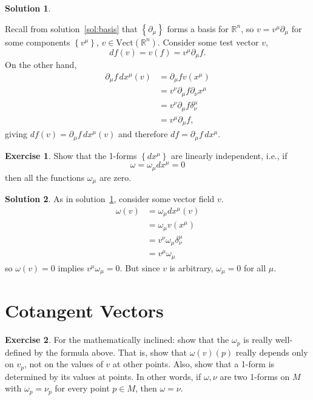 \documentclass[11pt, a4paper]{report}
\theoremstyle{definition}
\newtheorem{ex}{Exercise}[part]
\newtheorem{sol}{Solution}[part]
\begin{document}
\begin{sol}\label{sol:gradient}

Recall from solution~\ref{sol:basis} that $\left\{\partial_\mu\right\}$ forms a basis for $\mathbb{R}^n$, so $v = v^\mu \partial_\mu$ for some components $\left\{v^\mu\right\}$, $v \in \text{Vect}(\mathbb{R}^n)$. Consider some test vector $v$,
\[
    df(v) = v(f) = v^\mu \partial_\mu f.
\]
On the other hand,
\begin{align*}
    \partial_\mu f \, dx^\mu (v) &= \partial_\mu f v(x^\mu) \\
        &= v^\nu \partial_\mu f \partial_\nu x^\mu \\
        &= v^\nu \partial_\mu f \delta_\nu^\mu \\
        &= v^\mu \partial_\mu f,
\end{align*}
giving $df(v) = \partial_\mu f\, dx^\mu(v)$ and therefore $df = \partial_\mu f\, dx^\mu$.

\end{sol}

\begin{ex}

Show that the 1-forms $\left\{dx^\mu\right\}$ are linearly independent, i.e., if
\[
    \omega = \omega_\mu dx^\mu = 0
\]
then all the functions $\omega_\mu$ are zero.

\end{ex}

\begin{sol}

As in solution~\ref{sol:gradient}, consider some vector field $v$.
\begin{align*}
    \omega (v) &= \omega_\mu dx^\mu (v) \\
               &= \omega_\mu v(x^\mu) \\
               &= v^\nu \omega_\mu \delta_\nu^\mu \\
               &= v^\mu \omega_\mu
\end{align*}
so $\omega(v) = 0$ implies $v^\mu \omega_\mu = 0$. But since $v$ is arbitrary, $\omega_\mu = 0$ for all $\mu$.

\end{sol}

\section{Cotangent Vectors}\label{sec:cotangentvectors}

\begin{ex}

For the mathematically inclined: show that the $\omega_p$ is really well-defined by the formula above.
That is, show that $\omega(v)(p)$ really depends only on $v_p$, not on the values of $v$ at other points.
Also, show that a 1-form is determined by its values at points.
In other words, if $\omega, \nu$ are two 1-forms on $M$ with $\omega_p = \nu_p$ for every point $p \in M$, then $\omega = \nu$.

\end{ex}
\end{document}
